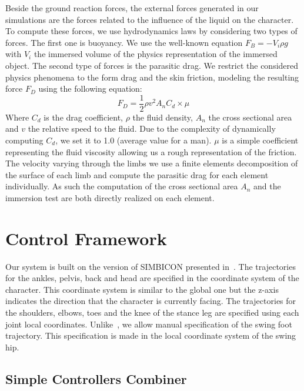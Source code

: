\documentclass[conference]{acmsiggraph}
\begin{document}
Beside the ground reaction forces, the external forces generated in our simulations are the forces related to the influence of the liquid on the character. To compute these forces, we use hydrodynamics laws by considering two types of forces. The first one is buoyancy. We use the well-known equation $F_{B}=-V_i \rho g$ with $V_i$ the immersed volume of the physics representation of the immersed object. The second type of forces is the parasitic drag. We restrict the considered physics phenomena to the form drag and the skin friction, modeling the resulting force $F_D$ using the following equation:
$$
F_D=\frac{1}{2} \rho v^2 A_n C_d \times \mu
$$
Where $C_d$ is the drag coefficient, $\rho$ the fluid density, $A_n$ the cross sectional area and $v$ the relative speed to the fluid. Due to the complexity of dynamically computing $C_d$, we set it to 1.0 (average value for a man). $\mu$ is a simple coefficient representing the fluid viscosity allowing us a rough representation of the friction. The velocity varying through the limbs we use a finite elements decomposition of the surface of each limb and compute the parasitic drag for each element individually. As such the computation of the cross sectional area $A_n$ and the immersion test are both directly realized on each element.

\section{Control Framework}
\label{sec:control_framework}

Our system is built on the version of SIMBICON presented in~\cite{coros2010generalized}. The trajectories for the ankles, pelvis, back and head are specified in the coordinate system of the character. This coordinate system is similar to the global one but the z-axis indicates the direction that the character is currently facing. The trajectories for the shoulders, elbows, toes and the knee of the stance leg are specified using each joint local coordinates. Unlike~\cite{coros2010generalized}, we allow manual specification of the swing foot trajectory. This specification is made in the local coordinate system of the swing hip.

\subsection{Simple Controllers Combiner}
\label{sec:multi_state}
\end{document}
